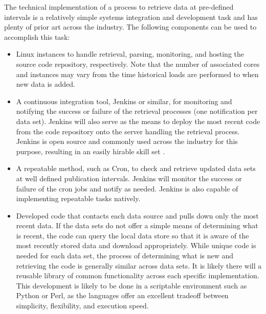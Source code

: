 The technical implementation of a process to retrieve data at pre-defined intervals is a relatively simple systems integration and development task and has plenty of prior art across the industry. The following components can be used to accomplish this task:
\begin{itemize}
	\item Linux instances to handle retrieval, parsing, monitoring, and hosting the source code repository, respectively. Note that the number of associated cores and instances may vary from the time historical loads are performed to when new data is added.
	\item A continuous integration tool, Jenkins or similar, for monitoring and notifying the success or failure of the retrieval processes (one notification per data set). Jenkins will also serve as the means to deploy the most recent code from the code repository onto the server handling the retrieval process. Jenkins is open source and commonly used across the industry for this purpose, resulting in an easily hirable skill set \cite{jenkins}.
	\item A repeatable method, such as Cron, to check and retrieve updated data sets at well defined publication intervals. Jenkins will monitor the success or failure of the cron jobs and notify as needed. Jenkins is also capable of implementing repeatable tasks natively.
	\item Developed code that contacts each data source and pulls down only the most recent data. If the data sets do not offer a simple means of determining what is recent, the code can query the local data store so that it is aware of the most recently stored data and download appropriately. While unique code is needed for each data set, the process of determining what is new and retrieving the code is generally similar across data sets. It is likely there will a reusable library of common functionality across each specific implementation. This development is likely to be done in a scriptable environment such as Python or Perl, as the languages offer an excellent tradeoff between simplicity, flexibility, and execution speed.
\end{itemize}
